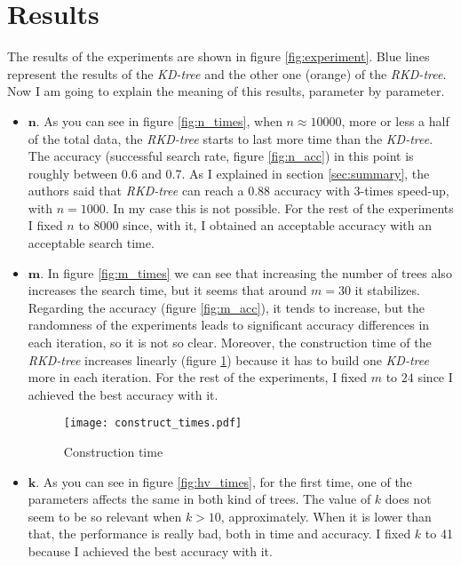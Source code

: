 \section{Results}
The results of the experiments are shown in figure \ref{fig:experiment}. Blue lines represent the results of the \textit{KD-tree} and the other one (orange) of the \textit{RKD-tree}. Now I am going to explain the meaning of this results, parameter by parameter.
\begin{itemize}
      \item $\mathbf{n}$. As you can see in figure \ref{fig:n_times}, when $n \approx 10000$, more or less a half of the total data, the \textit{RKD-tree} starts to last more time than the \textit{KD-tree}. The accuracy (successful search rate, figure \ref{fig:n_acc}) in this point is roughly between 0.6 and 0.7. As I explained in section \ref{sec:summary}, the authors said that \textit{RKD-tree} can reach a 0.88 accuracy with 3-times speed-up, with $n = 1000$. In my case this is not possible. For the rest of the experiments I fixed $n$ to $8000$ since, with it, I obtained an acceptable accuracy with an acceptable search time.
      \item $\mathbf{m}$. In figure \ref{fig:m_times} we can see that increasing the number of trees also increases the search time, but it seems that around $m = 30$ it stabilizes. Regarding the accuracy (figure \ref{fig:m_acc}), it tends to increase, but the randomness of the experiments leads to significant accuracy differences in each iteration, so it is not so clear. Moreover, the construction time of the \textit{RKD-tree} increases linearly (figure \ref{fig:const_times}) because it has to build one \textit{KD-tree} more in each iteration. For the rest of the experiments, I fixed $m$ to $24$ since I achieved the best accuracy with it.
      \begin{figure}[hbtp]
            \centering
            \texttt{[image: construct\_times.pdf]}
            \caption{Construction time}
            \label{fig:const_times}
      \end{figure}
      \item $\mathbf{k}$. As you can see in figure \ref{fig:hv_times}, for the first time, one of the parameters affects the same in both kind of trees. The value of $k$ does not seem to be so relevant when $k > 10$, approximately. When it is lower than that, the performance is really bad, both in time and accuracy. I fixed $k$ to 41 because I achieved the best accuracy with it.
\end{itemize}

